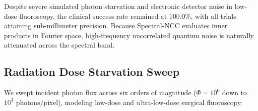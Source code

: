 \documentclass[journal,twocolumn]{IEEEtran}
\begin{document}
\begin{table}[htbp]
\caption{Clinical Patient DICOM CT Registration Benchmark (20 Trials)}
\label{tab:clinical}
\centering
{}
\end{table}

Despite severe simulated photon starvation and electronic detector noise in low-dose fluoroscopy, the clinical success rate remained at $100.0\%$, with all trials attaining sub-millimeter precision. Because Spectral-NCC evaluates inner products in Fourier space, high-frequency uncorrelated quantum noise is naturally attenuated across the spectral band.

\begin{table}[htbp]
\caption{Clinical Multi-Center Registration Benchmark across Independent CT Cohorts}
\label{tab:multicenter}
\centering
{}
\end{table}

\subsection{Radiation Dose Starvation Sweep}
We swept incident photon flux across six orders of magnitude ($\Phi = 10^6$ down to $10^3\text{ photons/pixel}$), modeling low-dose and ultra-low-dose surgical fluoroscopy:
\end{document}
